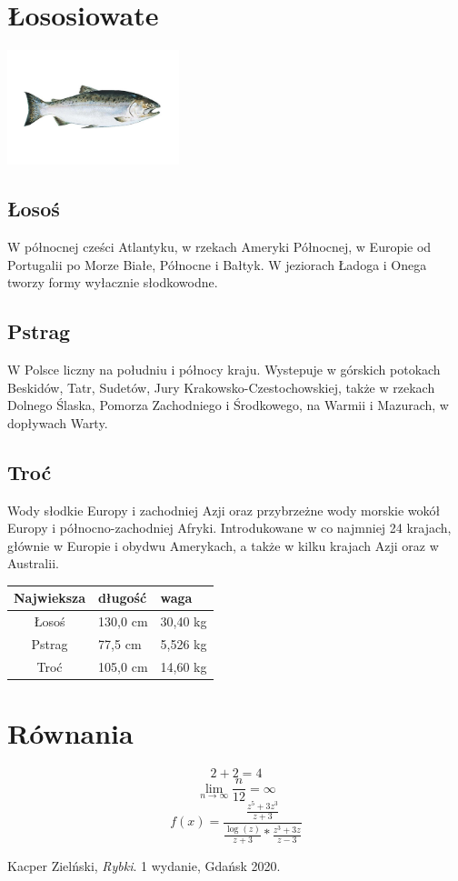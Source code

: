 \documentclass[12pt,a4paper,titlepage]{book}
\begin{document}
\chapter{Łososiowate}
\includegraphics[width=50mm,height=!]{losos}
\section{Łosoś}
W północnej cześci Atlantyku, w rzekach Ameryki Północnej, w Europie od Portugalii po Morze Białe, Północne i Bałtyk. W jeziorach Ładoga i Onega tworzy formy wyłacznie słodkowodne.
\section{Pstrag}
W Polsce liczny na południu i północy kraju. Wystepuje w górskich potokach Beskidów, Tatr, Sudetów, Jury Krakowsko-Czestochowskiej, także w rzekach Dolnego Ślaska, Pomorza Zachodniego i Środkowego, na Warmii i Mazurach, w dopływach Warty.
\section{Troć}
Wody słodkie Europy i zachodniej Azji oraz przybrzeżne wody morskie wokół Europy i północno-zachodniej Afryki. Introdukowane w co najmniej 24 krajach, głównie w Europie i obydwu Amerykach, a także w kilku krajach Azji oraz w Australii.
\begin{table}

\begin{center}
\begin{tabular}{|c||l|l|}
\hline Najwieksza & długość & waga \\ \hline \hline
Łosoś & 130,0 cm & 30,40 kg  \\
Pstrag & 77,5 cm & 5,526 kg  \\
Troć & 105,0 cm & 14,60 kg  \\ \hline
\end{tabular}
\end{center}
\end{table}
\chapter{Równania}
\begin{equation}
2+2=4
\end{equation}
$$\lim_{n \to \infty} \frac{n}{12}=\infty$$
$$f(x)= \frac{ \frac{z^5+3z^3}{z+3} }
{ \frac{\log(z)}{z+3}*\frac{z^3+3z}{z-3}}$$

\begin{thebibliography}{9}
 Kacper Zielński,
 \emph{Rybki}.
 1 wydanie, Gdańsk
 2020.
\end{thebibliography}
\end{document}
